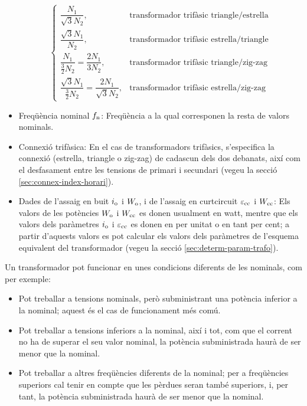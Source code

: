 \begin{itemize}
\begin{equation}
\begin{cases}
        \dfrac{N_1}{\sqrt{3}N_2}, & \text{transformador trifàsic triangle/estrella} \\[0.4cm]
        \dfrac{\sqrt{3}N_1}{N_2}, & \text{transformador trifàsic estrella/triangle} \\[0.4cm]
        \dfrac{N_1}{\frac{3}{2}N_2} = \dfrac{2 N_1}{3 N_2}, & \text{transformador trifàsic triangle/zig-zag} \\[0.4cm]
        \dfrac{\sqrt{3}N_1}{\frac{3}{2}N_2} = \dfrac{2 N_1}{\sqrt{3} N_2}, & \text{transformador trifàsic estrella/zig-zag}
         \end{cases}
       \end{equation}
   \item Freqüència nominal $f_\mathrm{n}$: Freqüència a la qual corresponen la resta de valors nominals.
   \item Connexió trifàsica: En el cas de transformadors trifàsics, s'especifica la connexió (estrella, triangle o zig-zag) de cadascun dels dos debanats, així com el desfasament entre les tensions de primari i secundari (vegeu la secció \vref{sec:connex-index-horari}).
   \item Dades de l'assaig en buit $i_\mathrm{o}$ i $W_\mathrm{o}$, i de l'assaig en curtcircuit $\varepsilon_\mathrm{cc}$ i $W_\mathrm{cc}$: Els valors de les potències $W_\mathrm{o}$ i $W_\mathrm{cc}$ es donen
usualment en watt, mentre que els valors dels paràmetres $i_\mathrm{o}$
i $\varepsilon_\mathrm{cc}$ es donen en per unitat o en tant per cent; a partir d'aquests valors es pot calcular els valors dels paràmetres de l'esquema equivalent del transformador  (vegeu la secció \vref{sec:determ-param-trafo}).
\end{itemize}

Un transformador pot funcionar en unes condicions diferents de les nominals, com per exemple:
\begin{itemize}
   \item Pot treballar a tensions nominals, però subministrant una potència inferior a la nominal; aquest és el cas de funcionament més comú.
   \item Pot treballar a tensions inferiors a la nominal, així i tot, com que el corrent no ha de superar el seu valor nominal, la potència subministrada haurà de ser menor que la nominal.
   \item Pot treballar a altres freqüències diferents de la nominal; per a freqüències superiors cal tenir en compte que les pèrdues seran també superiors, i, per tant, la potència subministrada haurà de ser menor que la nominal.
\end{itemize}

